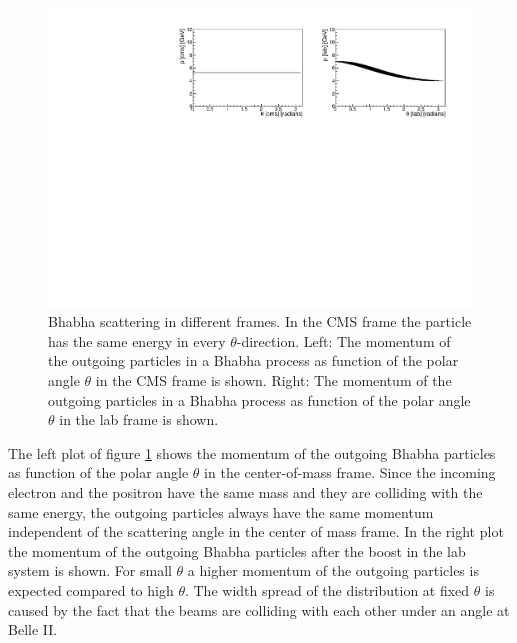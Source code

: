 \documentclass[a4paper,11pt,twosided,final,german,openbib,pdftex,listof=totoc,bibliography=totoc]{scrbook}
\begin{document}
\begin{figure}[h!]
	\centering
	\includegraphics[width=\textwidth]{Bilder/CThetaP}
	\caption[Momentum As Function Of $\theta$ In The CMS And LAB Frame]{Bhabha scattering in different frames. In the CMS frame the particle has the same energy in every $\theta$-direction. Left: The momentum of the outgoing particles in a Bhabha process as function of the polar angle $\theta$ in the CMS frame is shown. Right: The momentum of the outgoing particles in a Bhabha process as function of the polar angle $\theta$ in the lab frame is shown.}
	\label{fig:Belle IIMomentum}
	
\end{figure}

The left plot of figure \ref{fig:Belle IIMomentum} shows the momentum of the outgoing Bhabha particles as function of the polar angle $\theta$ in the center-of-mass frame. Since the incoming electron and the positron have the same mass and they are colliding with the same energy, the outgoing particles always have the same momentum independent of the scattering angle in the center of mass frame. In the right plot the momentum of the outgoing Bhabha particles after the boost in the lab system is shown. For small $\theta$ a higher momentum of the outgoing particles is expected compared to high $\theta$. The width spread of the distribution at fixed $\theta$ is caused by the fact that the beams are colliding with each other under an angle at Belle II.
\end{document}
